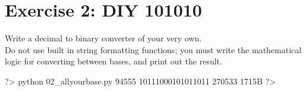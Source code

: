 \documentclass{42-en}
\begin{document}
\chapter{Exercise 2: DIY 101010}


\makeheaderfiles

Write a decimal to binary converter of your very own.\\

Do not use built in string formatting functions; you must write the mathematical logic for converting between bases, and print out the result.\\

\begin{42console}
	?> python 02_allyourbase.py 94555
	10111000101011011
	270533
	1715B
	?>
\end{42console}
\end{document}
